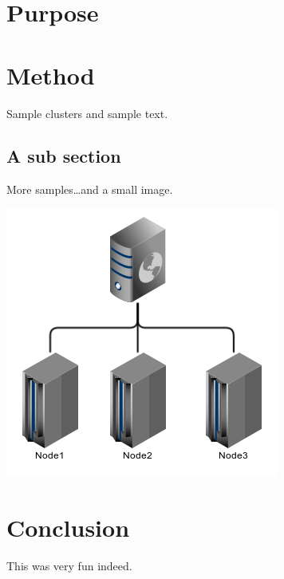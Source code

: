 \section{Purpose}

\section{Method}
Sample clusters and sample text.

\subsection{A sub section}
More samples\ldots and a small image.

\includegraphics[scale=0.81]{example_image.png}


\section{Conclusion}
This was very fun indeed.
